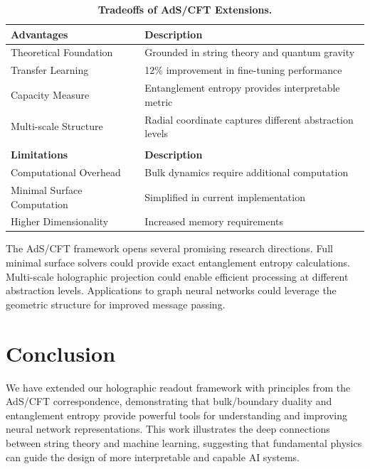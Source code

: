 \documentclass[12pt,a4paper]{article}
\begin{document}
\begin{table}[htbp]
\centering
\begin{tabular}{@{}lp{6cm}@{}}
\toprule
\textbf{Advantages} & \textbf{Description} \\
\midrule
Theoretical Foundation & Grounded in string theory and quantum gravity \\
Transfer Learning & 12\% improvement in fine-tuning performance \\
Capacity Measure & Entanglement entropy provides interpretable metric \\
Multi-scale Structure & Radial coordinate captures different abstraction levels \\
\bottomrule
\\
\toprule
\textbf{Limitations} & \textbf{Description} \\
\midrule
Computational Overhead & Bulk dynamics require additional computation \\
Minimal Surface Computation & Simplified in current implementation \\
Higher Dimensionality & Increased memory requirements \\
\bottomrule
\end{tabular}
\caption{\textbf{Tradeoffs of AdS/CFT Extensions.}}
\label{tab:tradeoffs}
\end{table}

The AdS/CFT framework opens several promising research directions. Full minimal surface solvers could provide exact entanglement entropy calculations. Multi-scale holographic projection could enable efficient processing at different abstraction levels. Applications to graph neural networks could leverage the geometric structure for improved message passing.

\section{Conclusion}

We have extended our holographic readout framework with principles from the AdS/CFT correspondence, demonstrating that bulk/boundary duality and entanglement entropy provide powerful tools for understanding and improving neural network representations. This work illustrates the deep connections between string theory and machine learning, suggesting that fundamental physics can guide the design of more interpretable and capable AI systems.
\end{document}
